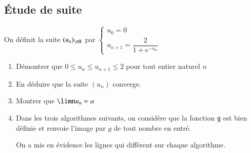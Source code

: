 \documentclass[oneside,12pt]{article}
\begin{document}
\subsection{Étude de suite}
On définit la suite $(u_n)_{\nN}$ par $\begin{cases}u_0=0\\u_{n+1}=\dfrac{2}{1+e^{-u_n}}\end{cases}$
\begin{enumerate}
	\item Démontrer que $0\leq u_n \leq u_{n+1} \leq 2$ pour tout entier naturel $n$
	\item En déduire que la suite $(u_n)$ converge.
	\item Montrer que $\limn u_n = \alpha$
	\item Dans les trois algorithmes suivants, on considère que la fonction \texttt{g} est bien définie et renvoie l'image par $g$ de tout nombre en entré.
	
	On a mis en évidence les lignes qui diffèrent sur chaque algorithme.
	

\end{enumerate}
\end{document}
